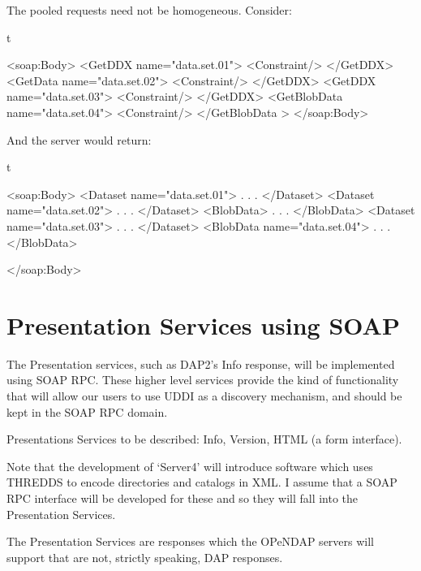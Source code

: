 \documentclass[justify]{dods-paper}
\begin{document}
 The pooled requests need not be homogeneous. Consider:
 
\begin{vcode}{t}

    <soap:Body>
        <GetDDX name="data.set.01">
            <Constraint/>
        </GetDDX>
        <GetData name="data.set.02">
            <Constraint/>
        </GetDDX>
        <GetDDX name="data.set.03">
            <Constraint/>
        </GetDDX>
        <GetBlobData name="data.set.04">
            <Constraint/>
        </GetBlobData >
    </soap:Body>
    
    
\end{vcode}


And the server would return:

\begin{vcode}{t}


    <soap:Body>
        <Dataset name="data.set.01">
            .
            .
            .
        </Dataset>
        <Dataset name="data.set.02">
            .
            .
            .
        </Dataset>
        <BlobData>
            .
            .
            .
        </BlobData>
        <Dataset name="data.set.03">
            .
            .
            .
        </Dataset>
        <BlobData name="data.set.04">
            .
            .
            .
        </BlobData>

    </soap:Body>
    
\end{vcode}

\section {Presentation Services using SOAP}
\label {SNGHSrvcs}

The Presentation services, such as DAP2's Info response, will be
implemented using SOAP RPC. These higher level services provide
the kind of functionality that will allow our users to use UDDI as a
discovery mechanism, and should be kept in the SOAP RPC domain.

Presentations Services to be described: Info, Version, HTML (a form
interface).

Note that the development of `Server4' will introduce software which
uses THREDDS to encode directories and catalogs in XML. I assume that
a SOAP RPC interface will be developed for these and so they will fall
into the Presentation Services. 

The Presentation Services are responses which the OPeNDAP servers will
support that are not, strictly speaking, DAP responses.
\end{document}

